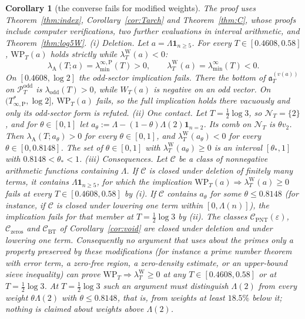 \documentclass[11pt]{amsart}
\newtheorem{corollary}[theorem]{Corollary}
\theoremstyle{definition}
\theoremstyle{remark}
\newcommand{\PT}{\mathcal P_T}
\newcommand{\lamW}{\lambda^{\mathrm W}_T}
\newcommand{\NT}{\mathcal N_T}
\newcommand{\laminf}{\lambda^{\infty}_{\min}}
\newcommand{\laminfP}{\lambda^{\infty,\mathrm P}_{\min}}
\begin{document}
\begin{corollary}[the converse fails for modified weights]\label{cor:convfail}
The proof uses Theorem~\ref{thm:index}, Corollary~\ref{cor:Tarch} and Theorem~\ref{thm:C}, whose proofs include
computer verifications, two further evaluations in interval arithmetic, and Theorem~\ref{thm:log5W}.
\emph{(i) Deletion.} Let $a=\Lambda\mathbf 1_{n\ge5}$. For every $T\in[0.4608,0.58]$, $\mathrm{WP}_T(a)$ holds
strictly while $\lambda^{\mathrm W}_T(a)<0$:
\[
\lambda_{\mathrm A}(T;a)=\laminfP(T)>0,\qquad\lambda^{\mathrm W}_T(a)=\laminf(T)<0 .
\]
On $[0.4608,\log2]$ the odd-sector implication fails. There the bottom of $\mathfrak a^{(v(a))}_T$ on $\PT^{\mathrm{odd}}$ is
$\lambda_{\mathrm{odd}}(T)>0$, while $W_T(a)$ is negative on an odd vector. On $(T^*_{\infty,\mathrm P},\log2]$,
$\mathrm{WP}_T(a)$ fails, so the full implication holds there vacuously and only its odd-sector form is refuted.
\emph{(ii) One contact.} Let $T=\frac12\log3$, so $\NT=\{2\}$, and for $\theta\in[0,1]$ let
$a_\theta:=\Lambda-(1-\theta)\Lambda(2)\mathbf 1_{n=2}$. Its comb on $\NT$ is $\theta v_2$. Then
$\lambda_{\mathrm A}(T;a_\theta)>0$ for every $\theta\in[0,1]$, and $\lambda^{\mathrm W}_T(a_\theta)<0$ for every
$\theta\in[0,0.8148]$. The set of $\theta\in[0,1]$ with $\lambda^{\mathrm W}_T(a_\theta)\ge0$ is an interval
$[\theta_*,1]$ with $0.8148<\theta_*<1$.
\emph{(iii) Consequences.} Let $\mathcal C$ be a class of nonnegative arithmetic functions containing $\Lambda$.
If $\mathcal C$ is closed under deletion of finitely many terms, it contains $\Lambda\mathbf 1_{n\ge5}$, for which
the implication $\mathrm{WP}_T(a)\Rightarrow\lambda^{\mathrm W}_T(a)\ge0$ fails at every $T\in[0.4608,0.58]$ by (i). If
$\mathcal C$ contains $a_\theta$ for some $\theta\le0.8148$ (for instance, if $\mathcal C$ is closed under lowering
one term within $[0,\Lambda(n)]$), the implication fails for that member at $T=\frac12\log3$ by (ii). The classes
$\mathcal C_{\mathrm{PNT}}(\varepsilon)$, $\mathcal C_{\mathrm{zeros}}$ and $\mathcal C_{\mathrm{BT}}$ of
Corollary~\ref{cor:void} are closed under deletion and under lowering one term. Consequently no argument
that uses about the primes only a property preserved by these modifications (for instance a prime number
theorem with error term, a zero-free region, a zero-density estimate, or an upper-bound sieve inequality)
can prove $\mathrm{WP}_T\Rightarrow\lamW\ge0$ at any $T\in[0.4608,0.58]$ or at $T=\frac12\log3$. At $T=\frac12\log3$
such an argument must distinguish $\Lambda(2)$ from every weight $\theta\Lambda(2)$ with $\theta\le0.8148$, that is,
from weights at least $18.5\%$ below it; nothing is claimed about weights above $\Lambda(2)$.
\end{corollary}
\end{document}
